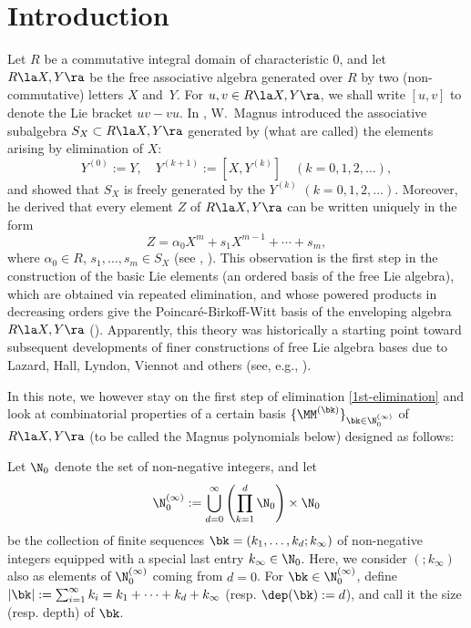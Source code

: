 \section{Introduction}

Let $R$ be a commutative integral domain of characteristic 0, and let $R\la X,Y\ra$ be
the free associative algebra generated over $R$ by two (non-commutative) 
letters $X$ and~$Y$.
For $u,v\in R\la X,Y\ra$, we shall write $[u,v]$
to denote the Lie bracket $uv-vu$.
In \cite{M37}, W.~Magnus introduced the associative subalgebra 
$S_X\subset R\la X,Y\ra$ generated by 
(what are called) the elements arising by elimination of $X$:
\begin{equation}
Y^{(0)}:=Y, \quad
Y^{(k+1)}:=[X,Y^{(k)}] \quad
(k=0,1,2,\dots),
\end{equation}
and showed that $S_X$ is freely generated by the $Y^{(k)}$
$(k=0,1,2,\dots)$.
Moreover, he derived that every element $Z$ of  $R\la X,Y\ra$ can be
written uniquely in the form
\begin{equation} \label{1st-elimination}
Z=\alpha_0 X^m +s_1 X^{m-1}+\cdots+s_m,
\end{equation}
where $\alpha_0\in R$, $s_1,\dots, s_m\in S_X$
(see \cite[Hilfssatz 2]{M37}, \cite[Lemma 5.6]{MKS}).
This observation is the first step in the construction 
of the basic Lie elements (an ordered basis of the free Lie algebra), 
which are obtained via repeated elimination, and
whose powered products in decreasing orders give 
the Poincar\'e-Birkoff-Witt
basis of the enveloping algebra~$R\la X,Y\ra$ (\cite[Theorem~5.8]{MKS}).
Apparently, this theory was historically a starting point 
toward subsequent developments of
finer constructions of free Lie algebra bases 
due to Lazard, Hall, Lyndon, Viennot and others
(see, e.g., \cite[Notes 4.5, 5.7]{Reu}). 

In this note, we however stay on the first step of elimination 
\eqref{1st-elimination} and 
look at combinatorial properties of a certain basis 
$\{\MM^{(\bk)}\}_{\bk\in \N_0^{(\infty)}}$ of $R\la X,Y\ra$
(to be called the Magnus polynomials below)
designed as follows: 

\begin{Notation} 
Let $\N_0$ denote the set of non-negative integers, and 
let 
$$
\N_0^{(\infty)}:=\bigcup_{d=0}^\infty
\left(
\prod_{k=1}^{d}\N_0\right)
\times \N_0 
$$ 
be the collection of finite sequences 
$
\bk=(k_1,\dots,k_d; k_\infty)
$
of non-negative integers equipped 
with a special last entry $k_\infty\in \N_0$. 
Here, we consider $(;k_\infty)$ also as elements of 
$\N_0^{(\infty)}$ coming from $d=0$.
For $\bk\in \N_0^{(\infty)}$, define
$|\bk|:=\sum_{i=1}^\infty k_i=k_1+\cdots+k_d+k_\infty$ 
(resp. $\dep(\bk):=d$),
and call it the size (resp. depth) of $\bk$.
\end{Notation}

